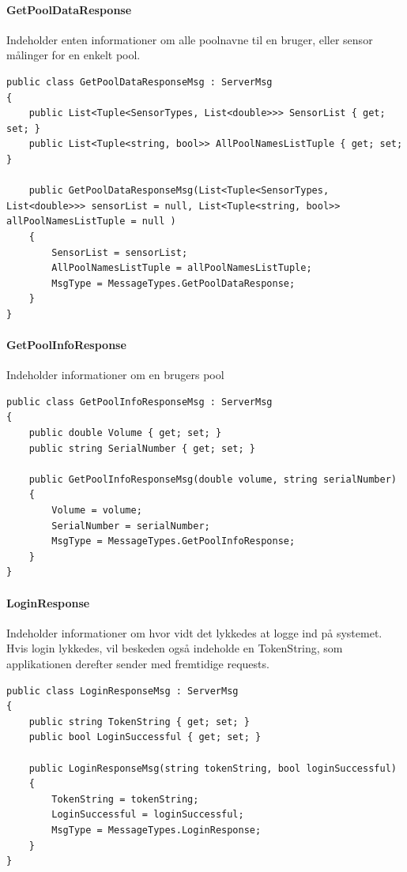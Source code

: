 \paragraph{GetPoolDataResponse}
Indeholder enten informationer om alle poolnavne til en bruger, eller sensor målinger for en enkelt pool.
\begin{lstlisting}[caption=GetPoolDataResponse, label=code:GetPoolDataResponse]
public class GetPoolDataResponseMsg : ServerMsg
{
	public List<Tuple<SensorTypes, List<double>>> SensorList { get; set; }
	public List<Tuple<string, bool>> AllPoolNamesListTuple { get; set; }
	
	public GetPoolDataResponseMsg(List<Tuple<SensorTypes, List<double>>> sensorList = null, List<Tuple<string, bool>> allPoolNamesListTuple = null )
	{
		SensorList = sensorList;
		AllPoolNamesListTuple = allPoolNamesListTuple;
		MsgType = MessageTypes.GetPoolDataResponse;
	}
}
\end{lstlisting}

\paragraph{GetPoolInfoResponse}
Indeholder informationer om en brugers pool
\begin{lstlisting}[caption=GetPoolInfoResponse, label=code:GetPoolInfoResponse]
public class GetPoolInfoResponseMsg : ServerMsg
{
	public double Volume { get; set; }
	public string SerialNumber { get; set; }
	
	public GetPoolInfoResponseMsg(double volume, string serialNumber)
	{
		Volume = volume;
		SerialNumber = serialNumber;
		MsgType = MessageTypes.GetPoolInfoResponse;
	}
}
\end{lstlisting}

\paragraph{LoginResponse}
Indeholder informationer om hvor vidt det lykkedes at logge ind på systemet. Hvis login lykkedes, vil beskeden også indeholde en TokenString, som applikationen derefter sender med fremtidige requests.
\begin{lstlisting}[caption=LoginResponse, label=code:LoginResponse]
public class LoginResponseMsg : ServerMsg
{
	public string TokenString { get; set; }
	public bool LoginSuccessful { get; set; }
	
	public LoginResponseMsg(string tokenString, bool loginSuccessful)
	{
		TokenString = tokenString;
		LoginSuccessful = loginSuccessful;
		MsgType = MessageTypes.LoginResponse;
	}
}
\end{lstlisting}

